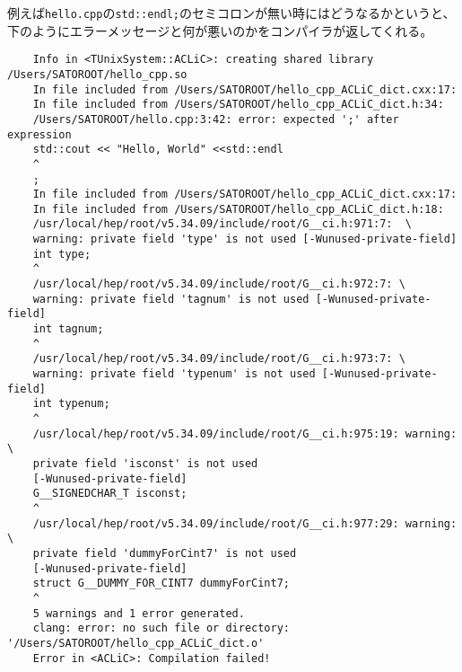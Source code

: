例えば\verb|hello.cpp|の\verb|std::endl;|のセミコロンが無い時にはどうなるかというと、
下のようにエラーメッセージと何が悪いのかをコンパイラが返してくれる。
\begin{verbatim}
	Info in <TUnixSystem::ACLiC>: creating shared library /Users/SATOROOT/hello_cpp.so
	In file included from /Users/SATOROOT/hello_cpp_ACLiC_dict.cxx:17:
	In file included from /Users/SATOROOT/hello_cpp_ACLiC_dict.h:34:
	/Users/SATOROOT/hello.cpp:3:42: error: expected ';' after expression
	std::cout << "Hello, World" <<std::endl 
	^
	;
	In file included from /Users/SATOROOT/hello_cpp_ACLiC_dict.cxx:17:
	In file included from /Users/SATOROOT/hello_cpp_ACLiC_dict.h:18:
	/usr/local/hep/root/v5.34.09/include/root/G__ci.h:971:7:  \
	warning: private field 'type' is not used [-Wunused-private-field]
	int type;
	^
	/usr/local/hep/root/v5.34.09/include/root/G__ci.h:972:7: \
	warning: private field 'tagnum' is not used [-Wunused-private-field]
	int tagnum;
	^
	/usr/local/hep/root/v5.34.09/include/root/G__ci.h:973:7: \
	warning: private field 'typenum' is not used [-Wunused-private-field]
	int typenum;
	^
	/usr/local/hep/root/v5.34.09/include/root/G__ci.h:975:19: warning: \
	private field 'isconst' is not used
	[-Wunused-private-field]
	G__SIGNEDCHAR_T isconst;
	^
	/usr/local/hep/root/v5.34.09/include/root/G__ci.h:977:29: warning: \
	private field 'dummyForCint7' is not used
	[-Wunused-private-field]
	struct G__DUMMY_FOR_CINT7 dummyForCint7;
	^
	5 warnings and 1 error generated.
	clang: error: no such file or directory: '/Users/SATOROOT/hello_cpp_ACLiC_dict.o'
	Error in <ACLiC>: Compilation failed!
\end{verbatim}
